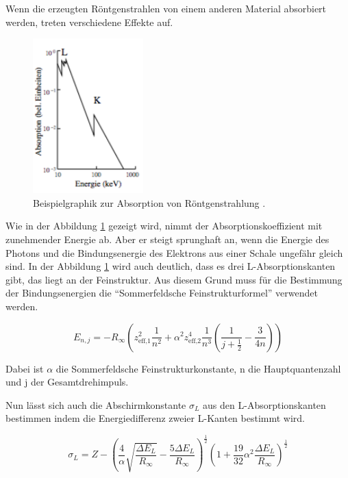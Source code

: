 Wenn die erzeugten Röntgenstrahlen von einem anderen Material absorbiert werden,
treten verschiedene Effekte auf.

\begin{figure}
  \centering
  \includegraphics[width=0.38\textwidth]{content/Absorption.png}
  \caption[width=\linewidth]{Beispielgraphik zur Absorption von Röntgenstrahlung \cite{1}.}
  \label{abb:1}
\end{figure}

Wie in der Abbildung \ref{abb:1} gezeigt wird, nimmt der Absorptionskoeffizient
mit zunehmender Energie ab. Aber er steigt sprunghaft an, wenn die Energie des Photons
und die Bindungsenergie des Elektrons aus einer Schale ungefähr gleich sind.
In der Abbildung \ref{abb:1} wird auch deutlich, dass es drei L-Absorptionskanten
gibt, das liegt an der Feinstruktur. Aus diesem Grund muss für die Bestimmung der
Bindungsenergien die \enquote{Sommerfeldsche Feinstrukturformel} verwendet werden.

\begin{equation}
  E_{n,j} = - R_\infty \left( z_\text{eff,1}^2 \frac{1}{n^2} + \alpha^2
  z_\text{eff,2}^4 \frac{1}{n^3} \left( \frac{1}{j+\frac{1}{2}} - \frac{3}{4n}
  \right)\right)
  \label{eq:3}
\end{equation}

Dabei ist $\alpha$ die Sommerfeldsche Feinstrukturkonstante, n die Hauptquantenzahl
und j der Gesamtdrehimpuls.

Nun lässt sich auch die Abschirmkonstante $\sigma_L$ aus den L-Absorptionskanten
bestimmen indem die Energiedifferenz zweier L-Kanten bestimmt wird.

\begin{equation}
  \sigma_L = Z - \left( \frac{4}{\alpha} \sqrt{\frac{\Delta E_L}{R_\infty}}
  - \frac{5 \Delta E_L}{R_\infty} \right)^{\frac{1}{2}} \left(
  1 + \frac{19}{32} \alpha^2 \frac{\Delta E_L}{R_\infty} \right)^{\frac{1}{2}}
  \label{eq:4}
\end{equation}

